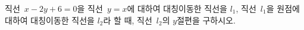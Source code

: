 직선~$x-2y+6=0$을 직선~$y=x$에 대하여 대칭이동한 직선을 $l_1$, 직선~$l_1$을 원점에 대하여 대칭이동한 직선을 $l_2$라 할 때, 직선~$l_2$의 $y$절편을 구하시오.
